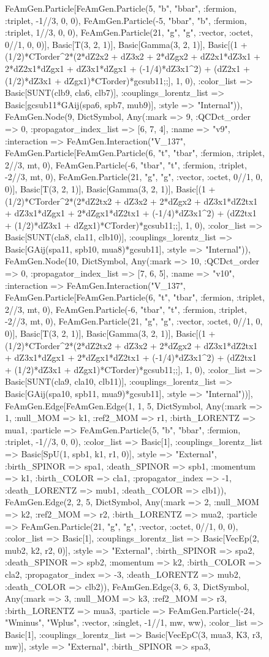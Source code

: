\documentclass{revtex4}
\begin{document}
\begin{figure}[!htb]
\begin{center}
{FeAmGen.Particle[FeAmGen.Particle(5, "b", "bbar", :fermion, :triplet, -1//3, 0, 0), FeAmGen.Particle(-5, "bbar", "b", :fermion, :triplet, 1//3, 0, 0), FeAmGen.Particle(21, "g", "g", :vector, :octet, 0//1, 0, 0)], Basic[T(3, 2, 1)], Basic[Gamma(3, 2, 1)], Basic[(1 + (1/2)*CTorder^2*(2*dZ2x2 + dZ3x2 + 2*dZgx2 + dZ2x1*dZ3x1 + 2*dZ2x1*dZgx1 + dZ3x1*dZgx1 + (-1/4)*dZ3x1^2) + (dZ2x1 + (1/2)*dZ3x1 + dZgx1)*CTorder)*gcsub11;;], 1, 0), :color_list => Basic[SUNT(clb9, cla6, clb7)], :couplings_lorentz_list => Basic[gcsub11*GAij(spa6, spb7, mub9)], :style => "Internal")), FeAmGen.Node(9, Dict{Symbol, Any}(:mark => 9, :QCDct_order => 0, :propagator_index_list => [6, 7, 4], :name => "v9", :interaction => FeAmGen.Interaction("V_137", FeAmGen.Particle[FeAmGen.Particle(6, "t", "tbar", :fermion, :triplet, 2//3, mt, 0), FeAmGen.Particle(-6, "tbar", "t", :fermion, :triplet, -2//3, mt, 0), FeAmGen.Particle(21, "g", "g", :vector, :octet, 0//1, 0, 0)], Basic[T(3, 2, 1)], Basic[Gamma(3, 2, 1)], Basic[(1 + (1/2)*CTorder^2*(2*dZ2tx2 + dZ3x2 + 2*dZgx2 + dZ3x1*dZ2tx1 + dZ3x1*dZgx1 + 2*dZgx1*dZ2tx1 + (-1/4)*dZ3x1^2) + (dZ2tx1 + (1/2)*dZ3x1 + dZgx1)*CTorder)*gcsub11;;], 1, 0), :color_list => Basic[SUNT(cla8, cla11, clb10)], :couplings_lorentz_list => Basic[GAij(spa11, spb10, mua8)*gcsub11], :style => "Internal")), FeAmGen.Node(10, Dict{Symbol, Any}(:mark => 10, :QCDct_order => 0, :propagator_index_list => [7, 6, 5], :name => "v10", :interaction => FeAmGen.Interaction("V_137", FeAmGen.Particle[FeAmGen.Particle(6, "t", "tbar", :fermion, :triplet, 2//3, mt, 0), FeAmGen.Particle(-6, "tbar", "t", :fermion, :triplet, -2//3, mt, 0), FeAmGen.Particle(21, "g", "g", :vector, :octet, 0//1, 0, 0)], Basic[T(3, 2, 1)], Basic[Gamma(3, 2, 1)], Basic[(1 + (1/2)*CTorder^2*(2*dZ2tx2 + dZ3x2 + 2*dZgx2 + dZ3x1*dZ2tx1 + dZ3x1*dZgx1 + 2*dZgx1*dZ2tx1 + (-1/4)*dZ3x1^2) + (dZ2tx1 + (1/2)*dZ3x1 + dZgx1)*CTorder)*gcsub11;;], 1, 0), :color_list => Basic[SUNT(cla9, cla10, clb11)], :couplings_lorentz_list => Basic[GAij(spa10, spb11, mua9)*gcsub11], :style => "Internal"))], FeAmGen.Edge[FeAmGen.Edge(1, 1, 5, Dict{Symbol, Any}(:mark => 1, :null_MOM => k1, :ref2_MOM => r1, :birth_LORENTZ => mua1, :particle => FeAmGen.Particle(5, "b", "bbar", :fermion, :triplet, -1//3, 0, 0), :color_list => Basic[1], :couplings_lorentz_list => Basic[SpU(1, spb1, k1, r1, 0)], :style => "External", :birth_SPINOR => spa1, :death_SPINOR => spb1, :momentum => k1, :birth_COLOR => cla1, :propagator_index => -1, :death_LORENTZ => mub1, :death_COLOR => clb1)), FeAmGen.Edge(2, 2, 5, Dict{Symbol, Any}(:mark => 2, :null_MOM => k2, :ref2_MOM => r2, :birth_LORENTZ => mua2, :particle => FeAmGen.Particle(21, "g", "g", :vector, :octet, 0//1, 0, 0), :color_list => Basic[1], :couplings_lorentz_list => Basic[VecEp(2, mub2, k2, r2, 0)], :style => "External", :birth_SPINOR => spa2, :death_SPINOR => spb2, :momentum => k2, :birth_COLOR => cla2, :propagator_index => -3, :death_LORENTZ => mub2, :death_COLOR => clb2)), FeAmGen.Edge(3, 6, 3, Dict{Symbol, Any}(:mark => 3, :null_MOM => k3, :ref2_MOM => r3, :birth_LORENTZ => mua3, :particle => FeAmGen.Particle(-24, "Wminus", "Wplus", :vector, :singlet, -1//1, mw, ww), :color_list => Basic[1], :couplings_lorentz_list => Basic[VecEpC(3, mua3, K3, r3, mw)], :style => "External", :birth_SPINOR => spa3, }
\end{center}
\end{figure}
\end{document}

